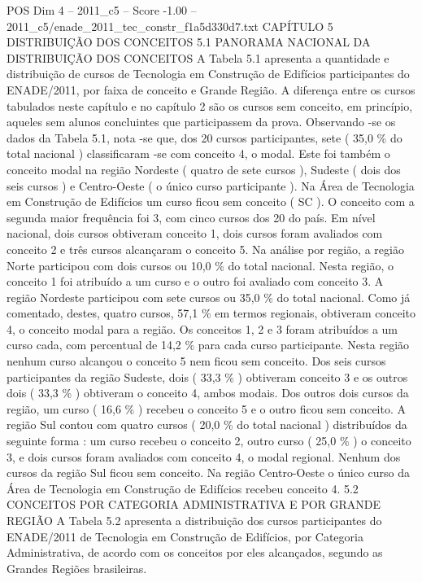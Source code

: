 \begin{textsample}{POS Dim 4 – 2011\_c5 – Score -1.00 – 2011\_c5/enade\_2011\_tec\_constr\_f1a5d330d7.txt}  \label{ex:f4_pos_241}
CAPÍTULO 5 DISTRIBUIÇÃO DOS CONCEITOS 5.1 PANORAMA NACIONAL DA DISTRIBUIÇÃO DOS CONCEITOS A Tabela 5.1 apresenta a quantidade e distribuição de cursos de Tecnologia em Construção de Edifícios participantes do ENADE/2011, por faixa de conceito e Grande Região.
A diferença entre os cursos tabulados neste capítulo e no capítulo 2 são os cursos sem conceito, em princípio, aqueles sem alunos concluintes que participassem da prova.
Observando -se os dados da Tabela 5.1, nota -se que, dos 20 cursos participantes, sete ( 35,0 \% do total nacional ) classificaram -se com conceito 4, o modal.
Este foi também o conceito modal na região Nordeste ( quatro de sete cursos ), Sudeste ( dois dos seis cursos ) e Centro-Oeste ( o único curso participante ).
Na Área de Tecnologia em Construção de Edifícios um curso ficou sem conceito ( SC ).
O conceito com a segunda maior frequência foi 3, com cinco cursos dos 20 do país.
Em nível nacional, dois cursos obtiveram conceito 1, dois cursos foram avaliados com conceito 2 e três cursos alcançaram o conceito 5.
Na análise por região, a região Norte participou com dois cursos ou 10,0 \% do total nacional.
Nesta região, o conceito 1 foi atribuído a um curso e o outro foi avaliado com conceito 3.
A região Nordeste participou com sete cursos ou 35,0 \% do total nacional.
Como já comentado, destes, quatro cursos, 57,1 \% em termos regionais, obtiveram conceito 4, o conceito modal para a região.
Os conceitos 1, 2 e 3 foram atribuídos a um curso cada, com percentual de 14,2 \% para cada curso participante.
Nesta região nenhum curso alcançou o conceito 5 nem ficou sem conceito.
Dos seis cursos participantes da região Sudeste, dois ( 33,3 \% ) obtiveram conceito 3 e os outros dois ( 33,3 \% ) obtiveram o conceito 4, ambos modais.
Dos outros dois cursos da região, um curso ( 16,6 \% ) recebeu o conceito 5 e o outro ficou sem conceito.
A região Sul contou com quatro cursos ( 20,0 \% do total nacional ) distribuídos da seguinte forma : um curso recebeu o conceito 2, outro curso ( 25,0 \% ) o conceito 3, e dois cursos foram avaliados com conceito 4, o modal regional.
Nenhum dos cursos da região Sul ficou sem conceito.
Na região Centro-Oeste o único curso da Área de Tecnologia em Construção de Edifícios recebeu conceito 4. 5.2 CONCEITOS POR CATEGORIA ADMINISTRATIVA E POR GRANDE REGIÃO A Tabela 5.2 apresenta a distribuição dos cursos participantes do ENADE/2011 de Tecnologia em Construção de Edifícios, por Categoria Administrativa, de acordo com os conceitos por eles alcançados, segundo as Grandes Regiões brasileiras.

\end{textsample}
